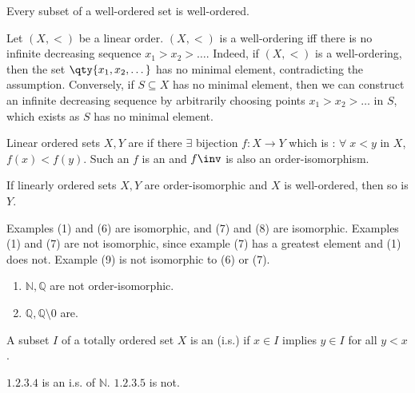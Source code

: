 \begin{note}
    Every subset of a well-ordered set is well-ordered.
\end{note}

\begin{remark}
    Let $(X, <)$ be a linear order.
    $(X, <)$ is a well-ordering iff there is no infinite decreasing sequence $x_1 > x_2 > \dots$.
    Indeed, if $(X, <)$ is a well-ordering, then the set $\qty{x_1, x_2, \dots}$ has no minimal element, contradicting the assumption.
    Conversely, if $S \subseteq X$ has no minimal element, then we can construct an infinite decreasing sequence by arbitrarily choosing points $x_1 > x_2 > \dots$ in $S$, which exists as $S$ has no minimal element.
\end{remark}

\begin{definition}
    Linear ordered sets $X, Y$ are  if there $\exists$ bijection $f : X \to Y$ which is : $\forall \; x < y$ in $X$, $f(x) < f(y)$.
    Such an $f$ is an  and $f\inv$ is also an order-isomorphism.
\end{definition}

\begin{note}
    If linearly ordered sets $X, Y$ are order-isomorphic and $X$ is well-ordered, then so is $Y$.
\end{note}

Examples (1) and (6) are isomorphic, and (7) and (8) are isomorphic.
Examples (1) and (7) are not isomorphic, since example (7) has a greatest element and (1) does not.
Example (9) is not isomorphic to (6) or (7).

\begin{example}
    \begin{enumerate}
        \item $\mathbb{N}, \mathbb{Q}$ are not order-isomorphic.
        \item $\mathbb{Q}, \mathbb{Q} \setminus \qty{0}$ are.
    \end{enumerate}
\end{example}

\begin{definition}
    A subset $I$ of a totally ordered set $X$ is an  (i.s.) if $x \in I$ implies $y \in I$ for all $y < x$.
\end{definition}

\begin{example}
    $\qty{1, 2, 3, 4}$ is an i.s. of $\mathbb{N}$.
    $\qty{1, 2, 3, 5}$ is not.
\end{example}

